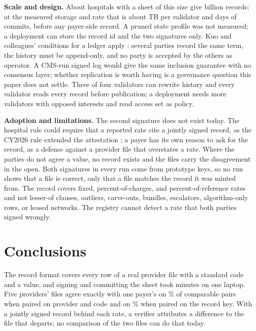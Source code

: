 \documentclass{IOS-Book-Article}
\begin{document}
\textbf{Scale and design.} About \projHospitals{} hospitals with a sheet of this size give \projRecordsB{} billion records; at the measured storage and rate that is about \projDiskTB{} TB per validator and \projCommitDays{} days of commits, before any payer-side record. A pruned state profile was not measured; a deployment can store the record id and the two signatures only. Kuo and colleagues' conditions for a ledger apply \cite{kuo2017}: several parties record the same term, the history must be append-only, and no party is accepted by the others as operator. A CMS-run signed log would give the same inclusion guarantee with no consensus layer; whether replication is worth having is a governance question this paper does not settle. Three of four validators can rewrite history and every validator reads every record before publication; a deployment needs more validators with opposed interests and read access set as policy.

\textbf{Adoption and limitations.} The second signature does not exist today. The hospital rule could require that a reported rate cite a jointly signed record, as the CY2026 rule extended the attestation \cite{opps2026}; a payer has its own reason to ask for the record, as a defense against a provider file that overstates a rate. Where the parties do not agree a value, no record exists and the files carry the disagreement in the open. Both signatures in every run come from prototype keys, so no run shows that a file is correct, only that a file matches the record it was minted from. The record covers fixed, percent-of-charges, and percent-of-reference rates and not lesser-of clauses, outliers, carve-outs, bundles, escalators, algorithm-only rows, or leased networks. The registry cannot detect a rate that both parties signed wrongly.

\section{Conclusions}

The record format covers every row of a real provider file with a standard code and a value, and signing and committing the sheet took \sheetTotalMin{} minutes on one laptop. Five providers' files agree exactly with one payer's on \coarseExact\% of comparable pairs when paired on provider and code and on \pairLineExact\% when paired on the record key. With a jointly signed record behind each rate, a verifier attributes a difference to the file that departs; no comparison of the two files can do that today.
\end{document}
